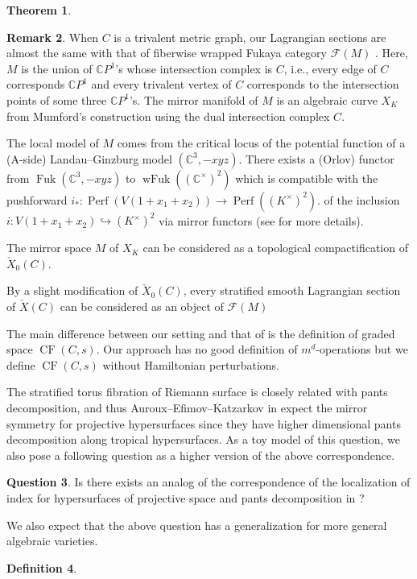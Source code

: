 \documentclass[a4paper,dvipdfmx,reqno,12pt]{amsart}
\theoremstyle{definition}
\newtheorem{Thm}{Theorem}[section]
\newtheorem{Def}[Thm]{Definition}
\newtheorem{Ques}[Thm]{Question}
\newtheorem{Rmk}[Thm]{Remark}
\newcommand{\C}{\mathbb{C}}%
\newcommand{\mcal}[1]{\mathcal{#1}}%
\newcommand{\opn}[1]{\operatorname{#1}}
\newcommand{\hookto}{\hookrightarrow}
\numberwithin{equation}{section}
\begin{document}
\begin{Thm}


\end{Thm}

\begin{Rmk} \label{rmk: curve_mirror}
When $C$ is a trivalent metric graph, 
our Lagrangian sections are 
almost the same with that of fiberwise wrapped Fukaya category 
$\mcal{F}(M)$ \cite[3.1]{auroux2022lagrangian}.
Here, $M$ is the
union of $\C P^{1}$'s whose intersection complex is $C$, 
i.e., every edge of $C$ corresponds
$\C P^{1}$ and every trivalent vertex of $C$ corresponds
to the intersection points of some three $\C P^{1}$'s.
The mirror manifold of $M$ is an algebraic curve $X_K$
from Mumford's construction using the dual intersection
complex $C$.

The local model of $M$ comes from the critical locus
of the potential function of a (A-side) Landau--Ginzburg 
model $(\C^{3},-xyz)$. There exists a (Orlov) functor
from $\opn{Fuk}(\C^{3},-xyz)$ 
to $\opn{wFuk}((\C^{\times})^2)$ which is compatible
with the pushforward 
$i_*:\opn{Perf}(V(1+x_1+x_2))\to \opn{Perf}((K^{\times})^{2})$. 
of the inclusion $i:V(1+x_1+x_2)\hookto (K^{\times})^2$
via mirror functors (see \cite[2.]{auroux2022lagrangian}
for more details). 

The mirror space $M$ of $X_K$ can be considered as a 
topological compactification of $\check{X}_0(C)$.

By a slight modification of $\check{X}_0(C)$, every 
stratified smooth Lagrangian section of $\check{X}(C)$ 
can be considered as an object of $\mcal{F}(M)$

The main difference between our setting and 
that of \cite{auroux2022lagrangian} 
is the definition of graded space $\opn{CF}(C,s)$. 
Our approach has no good definition 
of $m^{d}$-operations but we define $\opn{CF}(C,s)$ 
without Hamiltonian
perturbations.
\end{Rmk}

The stratified torus fibration of Riemann surface is 
closely related with pants decomposition, and thus
Auroux--Efimov--Katzarkov in \cite{auroux2022lagrangian} expect the mirror symmetry 
for projective hypersurfaces since they have higher 
dimensional pants decomposition \cite{MR2079993} along
tropical hypersurfaces.
As a toy model of this question, we also pose a 
following question as a higher version of the 
above correspondence.
\begin{Ques}
Is there exists an analog of the correspondence of the 
localization of index for
hypersurfaces of projective space and pants decomposition 
in \cite{MR2079993}?
\end{Ques}
We also expect that the above question has a generalization
for more general algebraic varieties.
\begin{Def} \label{def: weighted_lattice_points}

\end{Def}
\end{document}
